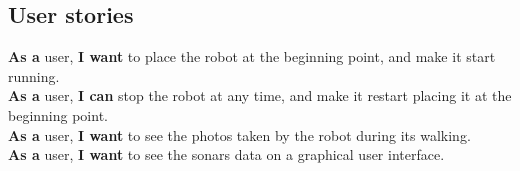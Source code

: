 \subsection{User stories}
\textbf{As a} user, \textbf{I want} to place the robot at the beginning point, and make it start running. \\
\textbf{As a} user, \textbf{I can} stop the robot at any time, and make it restart placing it at the beginning point. \\
\textbf{As a} user, \textbf{I want} to see the photos taken by the robot during its walking. \\
\textbf{As a} user, \textbf{I want} to see the sonars data on a graphical user interface.